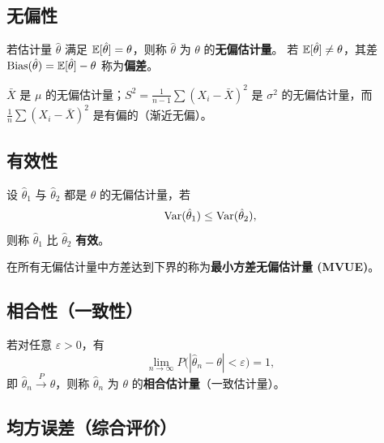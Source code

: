 \subsection{无偏性}

\begin{definition}[无偏估计量]
若估计量 $\hat{\theta}$ 满足 $\mathbb{E}[\hat{\theta}] = \theta$，则称 $\hat{\theta}$ 为 $\theta$ 的\textbf{无偏估计量}。
若 $\mathbb{E}[\hat{\theta}] \neq \theta$，其差 $\mathrm{Bias}(\hat{\theta}) = \mathbb{E}[\hat{\theta}] - \theta$ 称为\textbf{偏差}。
\end{definition}

\begin{example}
$\bar{X}$ 是 $\mu$ 的无偏估计量；$S^2 = \frac{1}{n-1}\sum(X_i - \bar{X})^2$ 是 $\sigma^2$ 的无偏估计量，而 $\frac{1}{n}\sum(X_i - \bar{X})^2$ 是有偏的（渐近无偏）。
\end{example}

\subsection{有效性}

\begin{definition}[有效性]
设 $\hat{\theta}_1$ 与 $\hat{\theta}_2$ 都是 $\theta$ 的无偏估计量，若
\begin{equation}
    \mathrm{Var}(\hat{\theta}_1) \le \mathrm{Var}(\hat{\theta}_2),
\end{equation}
则称 $\hat{\theta}_1$ 比 $\hat{\theta}_2$ \textbf{有效}。

在所有无偏估计量中方差达到下界的称为\textbf{最小方差无偏估计量 (MVUE)}。
\end{definition}

\subsection{相合性（一致性）}

\begin{definition}[相合估计量]
若对任意 $\varepsilon > 0$，有
\begin{equation}
    \lim_{n \to \infty} P\big(|\hat{\theta}_n - \theta| < \varepsilon\big) = 1,
\end{equation}
即 $\hat{\theta}_n \xrightarrow{P} \theta$，则称 $\hat{\theta}_n$ 为 $\theta$ 的\textbf{相合估计量}（一致估计量）。
\end{definition}

\subsection{均方误差（综合评价）}

